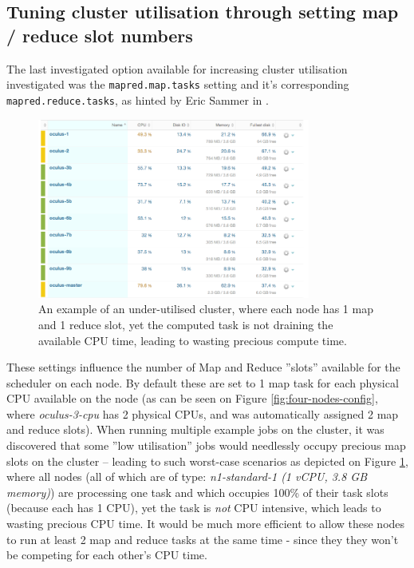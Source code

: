 \subsection{Tuning cluster utilisation through setting map / reduce slot numbers}
\label{sec:tuning-cluster-utilisation}
The last investigated option available for increasing cluster utilisation investigated was the \verb|mapred.map.tasks| setting and it's corresponding \verb|mapred.reduce.tasks|, as hinted by Eric Sammer in \cite{hadoop-ops}.

\begin{figure}[ch!]
  \centering
  \includegraphics[width=0.8\textwidth]{img/hadoop/10nodes-newrelic-suffering-from-no-data-locallity}
  \caption{An example of an under-utilised cluster, where each node has 1 map and 1 reduce slot, yet the computed task is not draining the available CPU time, leading to wasting precious compute time.}
  \label{fig:ten-under-utilised-cluster}
\end{figure}

These settings influence the number of Map and Reduce ''slots'' available for the scheduler on each node. By default these are set to 1 map task for each physical CPU available on the node (as can be seen on Figure \ref{fig:four-nodes-config}, where \textit{oculus-3-cpu} has 2 physical CPUs, and was automatically assigned 2 map and reduce slots). When running multiple example jobs on the cluster, it was discovered that some ''low utilisation'' jobs would needlessly occupy precious map slots on the cluster -- leading to such worst-case scenarios as depicted on Figure \ref{fig:ten-under-utilised-cluster}, where all nodes (all of which are of type: \textit{n1-standard-1 (1 vCPU, 3.8 GB memory)}) are processing one task and which occupies 100\% of their task slots (because each has 1 CPU), yet the task is \textit{not} CPU intensive, which leads to wasting precious CPU time. It would be much more efficient to allow these nodes to run at least 2 map and reduce tasks at the same time - since they they won't be competing for each other's CPU time.


